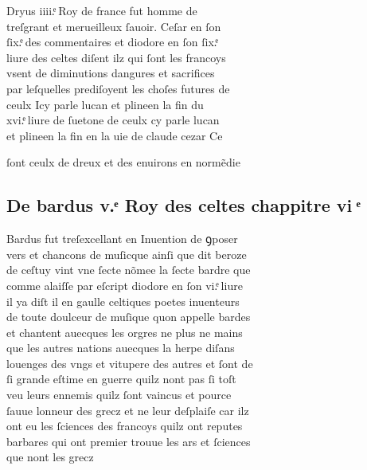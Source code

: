 \documentclass[12pt]{article}
\begin{document}
Dryus iiii.ͤ Roy de france fut homme de\\
treſgrant et merueilleux ſauoir. Ceſar en
            ſon\\
ſix.ͤ des commentaires et
            diodore en ſon ſix.ͤ\\
liure des celtes
          diſent ilz qui ſont les francoys\\
vsent de diminutions dangures et sacrifices\\
par leſquelles prediſoyent les choſes futures de\\
ceulx Icy parle lucan et
            plineen la fin du\\
xvi.ͤ liure de
            ſuetone de ceulx cy parle
            lucan\\
et plineen la fin en la uie de claude cezar Ce



\newpage
ſont ceulx de dreux et des enuirons en
          normẽdie





\subsection*{De bardus v.ͤ Roy des celtes chappitre
          vi ͤ}


Bardus fut treſexcellant en Inuention de
            ꝯposer\\
vers et chancons de muſicque ainſi que dit beroze\\
de ceſtuy vint vne ſecte nõmee la ſecte bardre que\\
comme alaiſſe par eſcript diodore
          en ſon vi.ͤ liure\\
il ya
          diſt il en gaulle celtiques poetes inuenteurs\\
de toute doulceur de muſique quon
          appelle bardes\\
et chantent auecques les orgres ne plus ne mains\\
que
          les autres nations auecques la herpe diſans\\
louenges des vngs et vitupere des
          autres et ſont de\\
ſi grande eſtime en guerre quilz nont pas ſi toſt\\
veu leurs ennemis quilz ſont vaincus et pource\\
ſauue lonneur des grecz et ne
          leur deſplaiſe car ilz\\
ont eu les ſciences des francoys quilz ont reputes\\
barbares qui ont premier trouue les ars et ſciences\\
que nont les
          grecz
\end{document}
